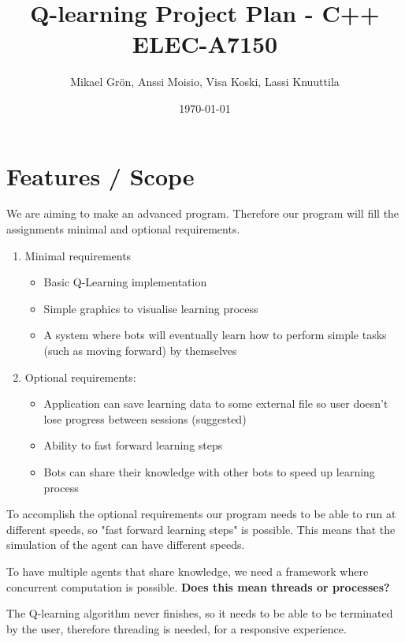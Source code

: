 \documentclass{article}
\author{Mikael Grön, Anssi Moisio, Visa Koski, Lassi Knuuttila}
\title{Q-learning Project Plan - C++ ELEC-A7150}
\date{\today}
\begin{document}
\maketitle

\tableofcontents
\newpage

\section{Features / Scope}
We are aiming to make an advanced program. Therefore our program will fill
the assignments minimal and optional requirements.

\begin{enumerate}
\item Minimal requirements
    \begin{itemize}
    \item Basic Q-Learning implementation
    \item Simple graphics to visualise learning process
    \item A system where bots will eventually learn how to perform simple
    tasks (such as moving forward) by themselves
    \end{itemize}
\item Optional requirements:
    \begin{itemize}
    \item Application can save learning data to some external file so user
    doesn't lose progress between sessions (suggested)
    \item Ability to fast forward learning steps
    \item Bots can share their knowledge with other bots to speed up learning
    process
    \end{itemize}
\end{enumerate}

To accomplish the optional requirements our program needs to be able to run
at different speeds, so "fast forward learning steps" is possible. This
means that the simulation of the agent can have different speeds.

To have multiple agents that share knowledge, we need a framework where
concurrent computation is possible. \textbf{Does this mean threads or
processes?}

The Q-learning algorithm never finishes, so it needs to be able to be terminated
by the user, therefore threading is needed, for a responsive experience.
\end{document}
